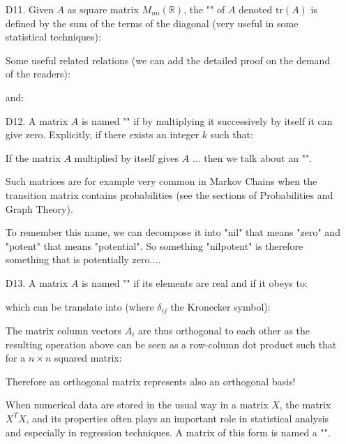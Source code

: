 \begin{enumerate}
		
		\item[D11.] Given $A$ as square matrix $M_{nn}(\mathbb{R})$, the "" of $A$ denoted $\text{tr}(A)$ is defined by the sum of the terms of the diagonal (very useful in some statistical techniques):
		
		Some useful related relations (we can add the detailed proof on the demand of the readers):
		
		and:
		

		\item[D12.] A matrix $A$ is named "" if by multiplying it successively by itself it can give zero. Explicitly, if there exists an integer $k$ such that:
		
		If the matrix $A$ multiplied by itself gives $A$ ... then we talk about an "".
		
		Such matrices are for example very common in Markov Chains when the transition matrix contains probabilities (see the sections of Probabilities and Graph Theory).
		\begin{tcolorbox}[title=Remark,colframe=black,arc=10pt]
		To remember this name, we can decompose it into "nil" that means "zero" and "potent" that means "potential". So something "nilpotent" is therefore something that is potentially zero....
		\end{tcolorbox}
		
		\item[D13.] A matrix $A$ is named "\label{orthogonal matrix}" if its elements are real and if it obeys to:
		
		which can be translate into (where $\delta_{ij}$ the Kronecker symbol):
		
		The matrix column vectors $A_i$ are thus orthogonal to each other as the resulting operation above can be seen as a row-column dot product such that for a $n\times n$ squared matrix:
		
		Therefore an orthogonal matrix represents also an orthogonal basis!
		
		\begin{tcolorbox}[title=Remarks,colframe=black,arc=10pt]
		When numerical data are stored in the usual way in a matrix $X$, the matrix $X^TX$, and its properties often plays an important role in statistical analysis and especially in regression techniques. A matrix of this form is named a "".
		\end{tcolorbox}
		

\end{enumerate}
